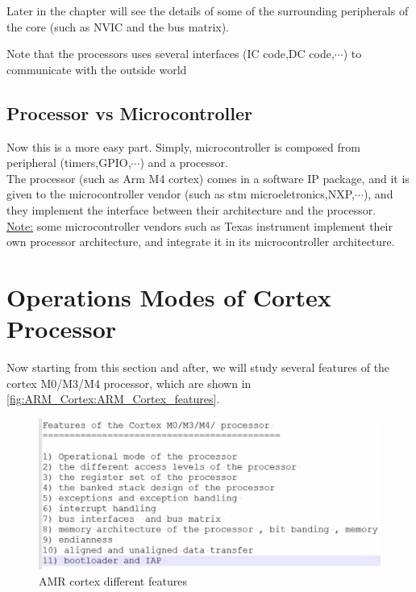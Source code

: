 Later in the chapter will see the details of some of the surrounding peripherals of the core (such as NVIC and the bus matrix).

Note that the processors uses several interfaces (IC code,DC code,$\cdots$) to communicate with the outside world

\newpage
\subsection{Processor vs Microcontroller}

Now this is a more easy part. Simply, microcontroller is composed from peripheral (timers,GPIO,$\cdots$) and a processor.\\

The processor (such as Arm M4 cortex) comes in a software IP package, and it is given to the microcontroller vendor (such as stm microeletronics,NXP,$\cdots$), and they implement the interface between their architecture and the processor.\\

\underline{Note:} some microcontroller vendors such as Texas instrument implement their own processor architecture, and integrate it in its microcontroller architecture.

\newpage
\section{Operations Modes of Cortex Processor}
\label{Sec:Operations_Modes}

Now starting from this section and after, we will study several features of the cortex M0/M3/M4 processor, which are shown in \autoref{fig:ARM_Cortex:ARM_Cortex_features}.

\begin{figure}[h]
\centering
\includegraphics[scale=0.7]{Figures/ARM_Cortex/ARM_Cortex_features}
\caption{AMR cortex different features}
\label{fig:ARM_Cortex:ARM_Cortex_features}
\end{figure}

